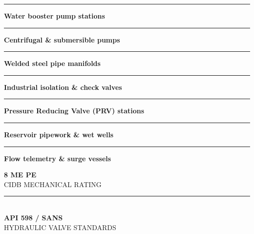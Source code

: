 \documentclass[a4paper,11pt]{article}
\begin{document}
\begin{minipage}[t]{0.34\textwidth}
    \vspace{0pt}
    \begin{tcolorbox}[
        enhanced, colback=mhoffwhite, colframe=mhnavy, boxrule=1pt, arc=4pt,
        title={\bfseries\color{white}\faCogs\ Mechanical Scope of Work},
        colbacktitle=mhnavy, left=7pt, right=7pt, top=6pt, bottom=6pt,
        drop shadow=black!6
    ]
        \fontsize{8.1pt}{11.6pt}\selectfont
        \textcolor{mhnavy}{\rule{4pt}{4pt}}\hspace{4pt}\textbf{Water booster pump stations}\\
        \textcolor{mhnavy}{\rule{4pt}{4pt}}\hspace{4pt}\textbf{Centrifugal \& submersible pumps}\\
        \textcolor{mhnavy}{\rule{4pt}{4pt}}\hspace{4pt}\textbf{Welded steel pipe manifolds}\\
        \textcolor{mhnavy}{\rule{4pt}{4pt}}\hspace{4pt}\textbf{Industrial isolation \& check valves}\\
        \textcolor{mhnavy}{\rule{4pt}{4pt}}\hspace{4pt}\textbf{Pressure Reducing Valve (PRV) stations}\\
        \textcolor{mhnavy}{\rule{4pt}{4pt}}\hspace{4pt}\textbf{Reservoir pipework \& wet wells}\\
        \textcolor{mhnavy}{\rule{4pt}{4pt}}\hspace{4pt}\textbf{Flow telemetry \& surge vessels}
    \end{tcolorbox}

    \vspace{0.20cm}

    \begin{tcolorbox}[
        enhanced, colback=white, colframe=mhlightgray, boxrule=0.8pt, arc=4pt,
        left=6pt, right=6pt, top=6pt, bottom=6pt, halign=center,
        drop shadow=black!4
    ]
        {\fontsize{18pt}{20pt}\selectfont\bfseries\color{mhblue}8 ME PE}\\[1pt]
        {\fontsize{7.4pt}{9pt}\selectfont\color{mhtextmuted}\MakeUppercase{CIDB Mechanical Rating}}\\[4pt]
        \textcolor{mhlightgray}{\rule{3.2cm}{0.6pt}}\\[4pt]
        {\fontsize{13pt}{15pt}\selectfont\bfseries\color{mhnavy}API 598 / SANS}\\[1pt]
        {\fontsize{7.2pt}{9pt}\selectfont\color{mhtextmuted}\MakeUppercase{Hydraulic Valve Standards}}
    \end{tcolorbox}
\end{minipage}
\end{document}
